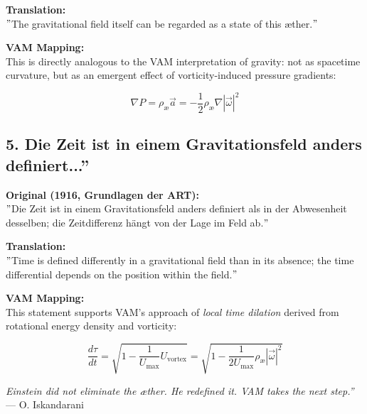     \textbf{Translation:} \\
    \("\)The gravitational field itself can be regarded as a state of this æther.\("\)

    \textbf{VAM Mapping:} \\
    This is directly analogous to the VAM interpretation of gravity: not as spacetime curvature, but as an emergent effect of vorticity-induced pressure gradients:

    \[
    \nabla P = \rho_\text{\ae} \vec{a} = -\frac{1}{2} \rho_\text{\ae} \nabla |\vec{\omega}|^2
    \]

    \subsection*{5. \grqq Die Zeit ist in einem Gravitationsfeld anders definiert...\textquotedblright}
    \textbf{Original (1916, Grundlagen der ART):} \\
    \("\)Die Zeit ist in einem Gravitationsfeld anders definiert als in der Abwesenheit desselben; die Zeitdifferenz hängt von der Lage im Feld ab.\("\)

    \textbf{Translation:} \\
    \("\)Time is defined differently in a gravitational field than in its absence; the time differential depends on the position within the field.\("\)

    \textbf{VAM Mapping:} \\
    This statement supports VAM's approach of \emph{local time dilation} derived from rotational energy density and vorticity:

    \[
    \frac{d\tau}{dt} = \sqrt{1 - \frac{1}{U_\text{max}} U_{\text{vortex}}} = \sqrt{1 - \frac{1}{2U_\text{max}} \rho_\text{\ae} |\vec{\omega}|^2}
    \]

    \bigskip
    \textit{\grqq Einstein did not eliminate the æther. He redefined it. VAM takes the next step.\textquotedblright} — O. Iskandarani